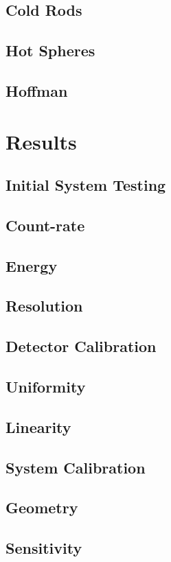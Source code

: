 \subsection{Cold Rods}
\subsection{Hot Spheres} 
\subsection{Hoffman}

\section{Results}
\subsection{Initial System Testing}
\subsection{Count-rate} 
\subsection{Energy}
\subsection{Resolution}
\subsection{Detector Calibration}
\subsection{Uniformity}
\subsection{Linearity} 
\subsection{System Calibration}
\subsection{Geometry}
\subsection{Sensitivity}
